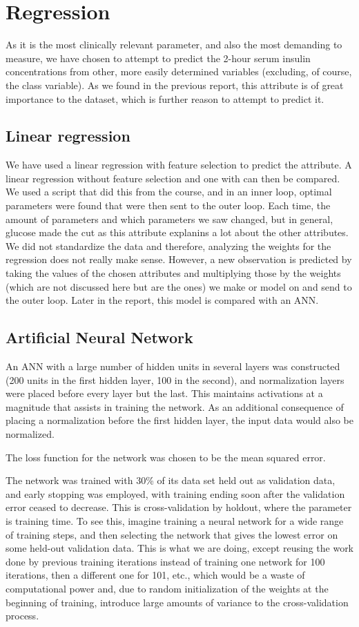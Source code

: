\section{Regression}
As it is the most clinically relevant parameter,
and also the most demanding to measure,
we have chosen to attempt to predict the 2-hour serum insulin concentrations
from other, more easily determined variables
(excluding, of course, the class variable).
As we found in the previous report,
this attribute is of great importance to the dataset,
which is further reason to attempt to predict it.

\subsection{Linear regression}
We have used a linear regression with feature selection to predict the attribute.
A linear regression without feature selection and one with can then be compared. We
used a script that did this from the course, and in an inner loop, optimal parameters
were found that were then sent to the outer loop. Each time, the amount of parameters
and which parameters we saw changed, but in general, glucose made the cut as this attribute
explanins a lot about the other attributes. We did not standardize the data and therefore,
analyzing the weights for the regression does not really make sense. However, a new
observation is predicted by taking the values of the chosen
attributes and multiplying those by the weights (which are not discussed here but are the ones)
we make or model on and send to the outer loop.
Later in the report, this model is compared with 
an ANN.
\subsection{Artificial Neural Network}
An ANN with a large number of hidden units in several layers was constructed
(200 units in the first hidden layer, 100 in the second),
and normalization layers were placed before every layer but the last.
This maintains activations at a magnitude that assists in training the network.
As an additional consequence of placing a normalization before the first hidden layer,
the input data would also be normalized.

The loss function for the network was chosen to be the mean squared error.

The network was trained with 30\% of its data set held out as validation data,
and early stopping was employed, with training ending soon after the validation error
ceased to decrease.
This is cross-validation by holdout,
where the parameter is training time.
To see this,
imagine training a neural network for a wide range of training steps,
and then selecting the network that gives the lowest error
on some held-out validation data.
This is what we are doing,
except reusing the work done by previous training iterations
instead of training one network for 100 iterations,
then a different one for 101, etc.,
which would be a waste of computational power
and, due to random initialization of the weights at the beginning of training,
introduce large amounts of variance to the cross-validation process.

